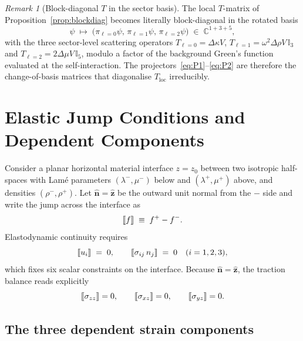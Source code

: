 \documentclass[11pt,a4paper]{article}
\newcommand{\nn}{\hat{\bm{n}}}
\newcommand{\jump}[1]{\left[\kern-1.5pt\left[#1\right]\kern-1.5pt\right]}
\theoremstyle{plain}
\theoremstyle{definition}
\theoremstyle{remark}
\newtheorem{remark}[proposition]{Remark}
\begin{document}
\begin{remark}[Block-diagonal $T$ in the sector basis]
The local $T$-matrix of Proposition~\ref{prop:blockdiag} becomes
literally block-diagonal in the rotated basis
\begin{equation}
  \psi \;\longmapsto\;
  \bigl(\pi_{\ell=0}\psi,\,\pi_{\ell=1}\psi,\,\pi_{\ell=2}\psi\bigr)
  \;\in\; \mathbb{C}^{1+3+5},
\end{equation}
with the three sector-level scattering operators
$T_{\ell=0}=\Delta\kappa V$,
$T_{\ell=1}=\omega^2\Delta\rho V\,\mathbb{I}_3$ and
$T_{\ell=2}=2\Delta\mu V\,\mathbb{I}_5$, modulo a factor of the
background Green's function evaluated at the self-interaction.  The
projectors~\eqref{eq:P1}--\eqref{eq:P2} are therefore the change-of-basis
matrices that diagonalise $T_{\text{loc}}$ irreducibly.
\end{remark}

\section{Elastic Jump Conditions and Dependent Components}\label{sec:jumps}
Consider a planar horizontal material interface $z=z_0$ between two
isotropic half-spaces with Lam\'e parameters $(\lambda^-,\mu^-)$ below
and $(\lambda^+,\mu^+)$ above, and densities $(\rho^-,\rho^+)$.  Let
$\nn=\hat{\bm{z}}$ be the outward unit normal from the $-$ side and
write the jump across the interface as
\begin{equation}
  \jump{f} \;\equiv\; f^+ - f^-.
\end{equation}
Elastodynamic continuity requires
\begin{equation}
  \jump{u_i} \;=\; 0,
  \qquad
  \jump{\sigma_{ij}\,n_j} \;=\; 0
  \quad (i=1,2,3),
  \label{eq:continuity}
\end{equation}
which fixes six scalar constraints on the interface.  Because
$\nn=\hat{\bm{z}}$, the traction balance reads explicitly
\begin{equation}
  \jump{\sigma_{zz}}=0,
  \qquad
  \jump{\sigma_{xz}}=0,
  \qquad
  \jump{\sigma_{yz}}=0.
  \label{eq:traction}
\end{equation}

\subsection{The three dependent strain components}
\end{document}
